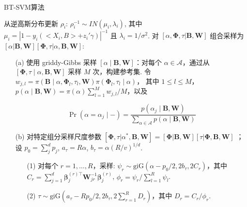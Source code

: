 \documentclass[AutoFakeBold]{LZUThesis}
\begin{document}
\begin{algorithm}
	\caption{BT-SVM算法}
	\label{Al:BTSVM}
	\begin{algorithmic}[1]
		\State 从逆高斯分布更新 $\rho_i$: $\rho_i^{-1} \sim IN(\mu_i, \lambda_i)$, 其中 $\mu_i = |1 - y_i(<X_i, B> + z_i'\gamma)|^{-1}$ 且 $\lambda_i = 1/\sigma^2$.
		\State 对 $[\alpha, \boldsymbol{\Phi}, \tau | \boldsymbol{B}, \boldsymbol{W}]$ 组合采样为$[\alpha|\boldsymbol{B},\boldsymbol{W}][\boldsymbol{\Phi},\tau|\alpha, \boldsymbol{B},\boldsymbol{W}]$:
		\begin{itemize}
			\item[(a)] 使用 griddy-Gibbs 采样 \( [\alpha \mid \boldsymbol{B}, \boldsymbol{W}] \)：对每个 \( \alpha \in \mathcal{A} \)，通过从
			\( [\boldsymbol{\Phi}, \tau \mid \alpha, \boldsymbol{B}, \boldsymbol{W}] \) 采样 \( M \) 次，构建参考集.
			令 \( w_{j,l} = \pi(\boldsymbol{B} \mid \alpha, \boldsymbol{\Phi}_l, \tau_l, \boldsymbol{W}) \pi(\boldsymbol{\Phi}_l, \tau_l \mid \alpha) \)，
			其中 \( 1 \leq l \leq M \)，
			\( p(\alpha \mid \boldsymbol{B}, \boldsymbol{W}) = \pi(\alpha) \sum_{l=1}^M w_{j,l}/M \)，以及
			
			\[
			\Pr(\alpha = \alpha_j \mid -) = \frac{p(\alpha_j \mid \boldsymbol{B}, \boldsymbol{W})}{\sum_{\alpha \in \mathcal{A}} p(\alpha \mid \boldsymbol{B}, \boldsymbol{W})}
			\]
			
			\item[(b)] 对特定组分采样尺度参数 $[\boldsymbol{\Phi}, \tau|\alpha^{*},\boldsymbol{B},\boldsymbol{W}] = [\boldsymbol{\Phi}|\boldsymbol{B},\boldsymbol{W}][\tau|\boldsymbol{\Phi,\boldsymbol{B},\boldsymbol{W}}]$
			；设 $p_0 = \sum_j^d p_j$, $a_\tau = R\alpha$, $b_\tau = \alpha(R/v)^{1/d}$.
			\begin{itemize}
				\item [(1)]对每个 $r=1,\dots,R$，采样:
				$\psi_r \sim \text{giG}(\alpha - p_0/2, 2b_\tau, 2C_r)$，其中 $C_r = \sum_{j=1}^d \boldsymbol{\boldsymbol{\beta}}_j^{(r)\top} \boldsymbol{W}_{jr}^{-1} \boldsymbol{\boldsymbol{\beta}}_j^{(r)}$,
				$\phi_r = \psi_r / \sum_{l=1}^R \psi_l$.
				\item [(2)]$\tau \sim \text{giG}(a_\tau - Rp_0/2, 2b_\tau, 2 \sum_{r=1}^R D_r)$，其中 $D_r = C_r/\phi_r$.
			\end{itemize}
		\end{itemize}
		

\end{algorithmic}
\end{algorithm}
\end{document}
